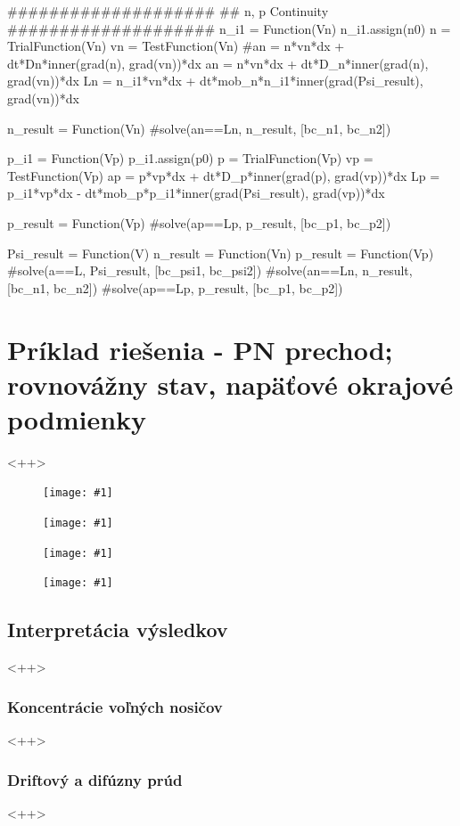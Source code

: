 \documentclass{eeict}
\newcommand{\myfig}[3]
{
    \begin{figure}[!ht]
	\centering
	\texttt{[image: \#1]}
	\caption{#2}
	#3
    \end{figure}
}
\newcommand{\myfigsc}[3]
{
    \begin{figure}[!ht]
	\centering
	\texttt{[image: \#1]}
	\caption{#2}
	#3
    \end{figure}
}
\begin{document}
\begin{mycode1}
####################
## n, p Continuity
####################
n_i1 = Function(Vn)
n_i1.assign(n0)
n = TrialFunction(Vn)
vn = TestFunction(Vn)
#an = n*vn*dx + dt*Dn*inner(grad(n), grad(vn))*dx
an = n*vn*dx + dt*D_n*inner(grad(n), grad(vn))*dx
Ln = n_i1*vn*dx + dt*mob_n*n_i1*inner(grad(Psi_result), grad(vn))*dx

n_result = Function(Vn)
#solve(an==Ln, n_result, [bc_n1, bc_n2])

p_i1 = Function(Vp)
p_i1.assign(p0)
p = TrialFunction(Vp)
vp = TestFunction(Vp)
ap = p*vp*dx + dt*D_p*inner(grad(p), grad(vp))*dx
Lp = p_i1*vp*dx - dt*mob_p*p_i1*inner(grad(Psi_result), grad(vp))*dx

p_result = Function(Vp)
#solve(ap==Lp, p_result, [bc_p1, bc_p2])
\end{mycode1}

\begin{mycode1}
Psi_result = Function(V)
n_result = Function(Vn)
p_result = Function(Vp)
#solve(a==L, Psi_result, [bc_psi1, bc_psi2])
#solve(an==Ln, n_result, [bc_n1, bc_n2])
#solve(ap==Lp, p_result, [bc_p1, bc_p2])
\end{mycode1}

\section{Príklad riešenia - PN prechod; rovnovážny stav, napäťové okrajové podmienky}<++>
\myfigsc{tmp1}{}{}
\myfigsc{tmp2}{}{}
\myfigsc{tmp3}{}{}
\myfigsc{tmp4}{}{}
\subsection{Interpretácia výsledkov}<++>
\subsubsection{Koncentrácie voľných nosičov}<++>
\subsubsection{Driftový a difúzny prúd}<++>


\end{document}
